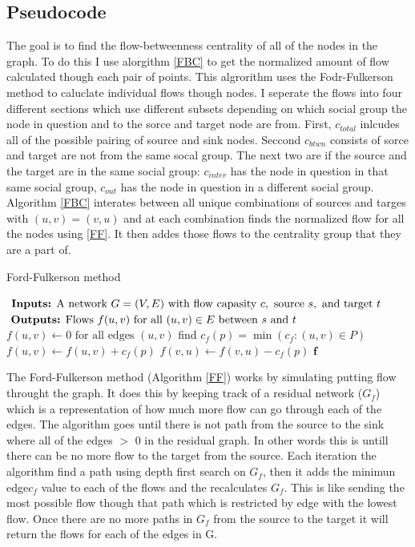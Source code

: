 \documentclass{sig-alternate-05-2015}
\begin{document}
\subsection{Pseudocode}
The goal is to find the flow-betweenness centrality of all of the nodes in the graph.  To do this I use alorgithm \ref{FBC} to get the normalized amount of flow calculated though each pair of points.  This algrorithm uses the Fodr-Fulkerson method to caluclate individual flows though nodes.  I seperate the flows into four different sections which use different subsets depending on which social group the node in question and to the sorce and target node are from.  First, $c_{total}$ inlcudes all of the possible pairing of source and sink nodes.  Seccond $c_{btwn}$ consists of sorce and target are not from the same socal group.  The next two are if the source and the target are in the same social group: $c_{inter}$ has the node in question in that same social group, $c_{out}$ has the node in question in a different social group. Algorithm \ref{FBC} interates between all unique combinations of sources and targes with $(u,v) = (v,u)$ and at each combination finds the normalized flow for all the nodes using \ref{FF}.  It then addes those flows to the centrality group that they are a part of.  


\begin{algorithm}[b]
\caption{Ford-Fulkerson method}
\label{FF}
\begin{algorithmic}
\STATE $\text{ \textbf{Inputs:} A network } G = (V, E) \text{ with flow capasity } c, \text{ source } s, \text{ and target } t$ 
\STATE $ \text{ \textbf{Outputs:} Flows } f(u, v) \text{ for all }(u, v) \in E \text{ between }s \text{ and }t$
\STATE $f(u, v) \leftarrow 0 \text{ for all edges } (u, v)$
\STATE find $c_{f}(p) = \min (c_{f}:(u, v) \in P)$
\STATE  $f(u, v) \leftarrow f(u,v) + c_{f}(p)$
\STATE  $f(v, u) \leftarrow f(v,u) - c_{f}(p)$
\ENDFOR
\ENDWHILE
\RETURN $\mathbf{f}$
\end{algorithmic}
\end{algorithm}


The Ford-Fulkerson method (Algorithm \ref{FF}) works by simulating putting flow throught the graph.  It does this by keeping track of a residual network ($G_{f}$) which is a representation of how much more flow can go through each of the edges.  The algorithm goes until there is not path from the source to the sink where all of the edges $>$ 0 in the residual graph.  In other words this is untill there can be no more flow to the target from the source.  Each iteration the algorithm find a path using depth first search on $G_{f}$, then it adds the minimun edge$ c_{f}$ value to each of the flows and the recalculates $G_{f}$.  This is like sending the most possible flow though that path which is restricted by edge with the lowest flow.  Once there are no more paths in $G_{f}$ from the source to the target it will return the flows for each of the edges in G.
\end{document}
